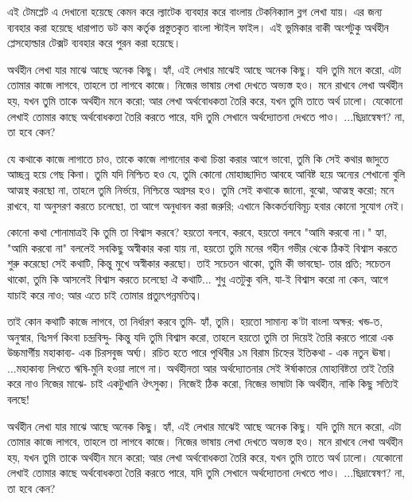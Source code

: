 এই টেমপ্লেট এ দেখানো হয়েছে কেমন করে ল্যাটেক ব্যবহার করে বাংলায় টেকনিক্যাল ব্লগ লেখা যায়। এর জন্য ব্যবহার করা হয়েছে ধারাপাত ডট কম কর্তৃক প্রস্তুতকৃত বাংলা স্টাইল ফাইল। এই ভুমিকার বাকী অংশটুকু অর্থহীন প্লেসহোল্ডার টেক্সট ব্যবহার করে পুরন করা হয়েছে।

অর্থহীন লেখা যার মাঝে আছে অনেক কিছু। হ্যাঁ, এই লেখার মাঝেই আছে অনেক কিছু। যদি তুমি মনে করো, এটা তোমার কাজে লাগবে, তাহলে তা লাগবে কাজে। নিজের ভাষায় লেখা দেখতে অভ্যস্ত হও। মনে রাখবে লেখা অর্থহীন হয়, যখন তুমি তাকে অর্থহীন মনে করো; আর লেখা অর্থবোধকতা তৈরি করে, যখন তুমি তাতে অর্থ ঢালো। যেকোনো লেখাই তোমার কাছে অর্থবোধকতা তৈরি করতে পারে, যদি তুমি সেখানে অর্থদ্যোতনা দেখতে পাও। ...ছিদ্রান্বেষণ? না, তা হবে কেন?

যে কথাকে কাজে লাগাতে চাও, তাকে কাজে লাগানোর কথা চিন্তা করার আগে ভাবো, তুমি কি সেই কথার জাদুতে আচ্ছন্ন হয়ে গেছ কিনা। তুমি যদি নিশ্চিত হও যে, তুমি কোনো মোহাচ্ছাদিত আবহে আবিষ্ট হয়ে অন্যের শেখানো বুলি আত্মস্থ করছো না, তাহলে তুমি নির্ভয়ে, নিশ্চিন্তে অগ্রসর হও। তুমি সেই কথাকে জানো, বুঝো, আত্মস্থ করো; মনে রাখবে, যা অনুসরণ করতে চলেছো, তা আগে অনুধাবন করা জরুরি; এখানে কিংকর্তব্যবিমূঢ় হবার কোনো সুযোগ নেই।

কোনো কথা শোনামাত্রই কি তুমি তা বিশ্বাস করবে? হয়তো বলবে, করবে, হয়তো বলবে "আমি করবো না।" হ্যা, "আমি করবো না" বললেই সবকিছু অস্বীকার করা যায় না, হয়তো তুমি মনের গহীন গভীর থেকে ঠিকই বিশ্বাস করতে শুরু করেছো সেই কথাটি, কিন্তু মুখে অস্বীকার করছো। তাই সচেতন থাকো, তুমি কী ভাবছো- তার প্রতি; সচেতন থাকো, তুমি কি আসলেই বিশ্বাস করতে চলেছো ঐ কথাটি... শুধু এতটুকু বলি, যা-ই বিশ্বাস করো না কেন, আগে যাচাই করে নাও; আর এতে চাই তোমার প্রত্যুৎপন্নমতিত্ব।

তাই কোন কথাটি কাজে লাগবে, তা নির্ধারণ করবে তুমি- হ্যাঁ, তুমি। হয়তো সামান্য ক'টা বাংলা অক্ষর: খন্ড-ত, অনুস্বার, বিঃসর্গ কিংবা চন্দ্রবিন্দু- কিন্তু যদি তুমি বিশ্বাস করো, তাহলে হয়তো তুমি তা দিয়েই তৈরি করতে পারো এক উচ্চমার্গীয় মহাকাব্য- এক চিরসবুজ অর্ঘ্য। রচিত হতে পারে পৃথিবীর ১ম বিরাম চিহ্নের ইতিকথা - এক নতুন ঊষা। ...মহাকাব্য লিখতে ঋষি-মুনি হওয়া লাগে না।
অর্থহীনতা আর অর্থদ্যোতনার সেই ঈর্ষাকাতর মোহাবিষ্টতা তাই তৈরি করে নাও নিজের মাঝে- চাই একটুখানি ঔৎসুক্য। নিজেই ঠিক করো, নিজের ভাষাটা কি অর্থহীন, নাকি কিছু সত্যিই বলছে!

অর্থহীন লেখা যার মাঝে আছে অনেক কিছু। হ্যাঁ, এই লেখার মাঝেই আছে অনেক কিছু। যদি তুমি মনে করো, এটা তোমার কাজে লাগবে, তাহলে তা লাগবে কাজে। নিজের ভাষায় লেখা দেখতে অভ্যস্ত হও। মনে রাখবে লেখা অর্থহীন হয়, যখন তুমি তাকে অর্থহীন মনে করো; আর লেখা অর্থবোধকতা তৈরি করে, যখন তুমি তাতে অর্থ ঢালো। যেকোনো লেখাই তোমার কাছে অর্থবোধকতা তৈরি করতে পারে, যদি তুমি সেখানে অর্থদ্যোতনা দেখতে পাও। ...ছিদ্রান্বেষণ? না, তা হবে কেন?


